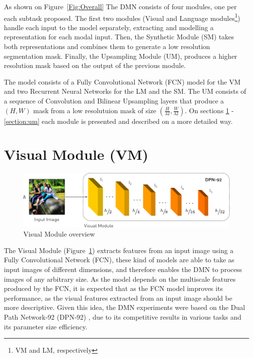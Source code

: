 As shown on Figure~\ref{Fig:Overall} The DMN consists of four modules, one per each subtask proposed. The first two modules (Visual and Language modules\footnote{VM and LM, respectively}) handle each input to the model separately, extracting and modelling a representation for each modal input. Then, the Synthetic Module (SM) takes both representations and combines them to generate a low resolution segmentation mask. Finally, the Upsampling Module (UM), produces a higher resolution mask based on the output of the previous module.

The model consists of a Fully Convolutional Network (FCN) model for the VM and two Recurrent Neural Networks for the LM and the SM. The UM consists of a sequence of Convolution and Bilinear Upsampling layers that produce a $(H, W)$ mask from a low resolutuion mask of size $\left(\frac{H}{32}, \frac{W}{32}\right)$. On sections \ref{section:vm} - \ref{section:um} each module is presented and described on a more detailed way.

\section{Visual Module (VM)}
\label{section:vm}

\begin{figure}
\centering
\includegraphics[width=\textwidth]{./figures/Visual_Module.pdf}
\caption{Visual Module overview}
\label{Fig:VM}
\end{figure}


The Visual Module (Figure~\ref{Fig:VM}) extracts features from an input image using a Fully Convolutional Network (FCN), these kind of models are able to take as input images of different dimensions, and therefore enables the DMN to process images of any arbitrary size. As the model depends on the multiscale features produced by the FCN, it is expected that as the FCN model improves its performance, as the visual features extracted from an input image should be more descriptive. Given this idea, the DMN experiments were based on the Dual Path Network-92 (DPN-92) \cite{DBLP:journals/corr/ChenLXJYF17}, due to its competitive results in various tasks and its parameter size efficiency.

